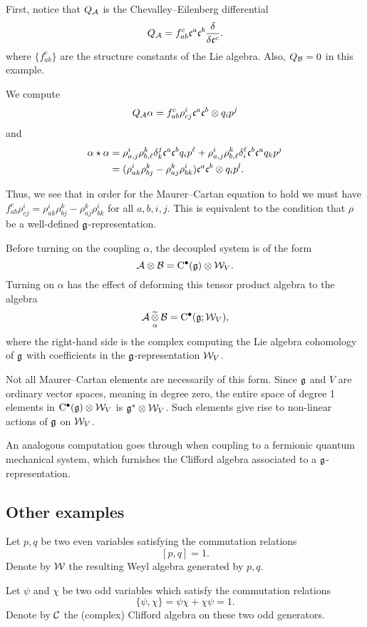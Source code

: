 \documentclass[11pt]{amsart}
\begin{document}
First, notice that $Q_{\mathcal A}$ is the Chevalley--Eilenberg differential 
\[
Q_{\mathcal A} = f_{ab}^c \mathfrak c^a \mathfrak c^b \frac{\delta}{\delta \mathfrak c^c} .
\]
where $\{f_{ab}^c\}$ are the structure constants of the Lie algebra. 
Also, $Q_{\mathcal B} = 0$ in this example. 

We compute
\[
Q_{\mathcal A} \alpha = f_{ab}^c \rho_{cj}^i \mathfrak c^a \mathfrak c^b \otimes q_i p^j 
\]
and
\begin{align*}
\alpha \star \alpha & = \rho_{a,j}^i \rho_{b,\ell}^k \delta^j_k \mathfrak c^a \mathfrak c^b q_i p^\ell + \rho_{a,j}^i \rho_{b,\ell}^k \delta^\ell_i \mathfrak c^b \mathfrak c^a q_k p^j   \\
& = (\rho_{ak}^i \rho_{bj}^k  - \rho_{aj}^k \rho^i_{bk}) \mathfrak c^a \mathfrak c^b \otimes q_i p^l .
\end{align*}

Thus, we see that in order for the Maurer--Cartan equation to hold we must have $f_{ab}^c \rho_{cj}^i = \rho_{ak}^i \rho_{bj}^k  - \rho_{aj}^k \rho^i_{bk}$ for all $a,b,i,j$.
This is equivalent to the condition that $\rho$ be a well-defined $\mathfrak g$-representation. 

Before turning on the coupling $\alpha$, the decoupled system is of the form
\[
\mathcal A \otimes \mathcal B = {\rm C}^\bullet(\mathfrak g) \otimes \mathcal W_V . 
\]
Turning on $\alpha$ has the effect of deforming this tensor product algebra to the algebra
\[
\mathcal A \, \underset{\alpha}{\widetilde{\otimes}} \, \mathcal B = {\rm C}^\bullet(\mathfrak g ; \mathcal W_V) ,
\]
where the right-hand side is the complex computing the Lie algebra cohomology of $\mathfrak g$ with coefficients in the $\mathfrak g$-representation $\mathcal W_V$. 

Not all Maurer--Cartan elements are necessarily of this form. 
Since $\mathfrak g$ and $V$ are ordinary vector spaces, meaning in degree zero, the entire space of degree 1 elements in ${\rm C}^\bullet(\mathfrak g) \otimes \mathcal W_V$ is $\mathfrak g^* \otimes \mathcal W_V$. 
Such elements give rise to non-linear actions of $\mathfrak g$ on $\mathcal W_V$. 

An analogous computation goes through when coupling to a fermionic quantum mechanical system, which furnishes the Clifford algebra associated to a $\mathfrak g$-representation.

\subsection{Other examples}

Let $p,q$ be two even variables satisfying the commutation relations
\[
[p,q] = 1.
\]
Denote by $\mathcal W$ the resulting Weyl algebra generated by $p,q$.
 
Let $\psi$ and $\chi$ be two odd variables which satisfy the commutation relations
\[
\{\psi, \chi\} = \psi \chi + \chi \psi = 1.
\]
Denote by $\mathcal C$ the (complex) Clifford algebra on these two odd generators.
\end{document}
